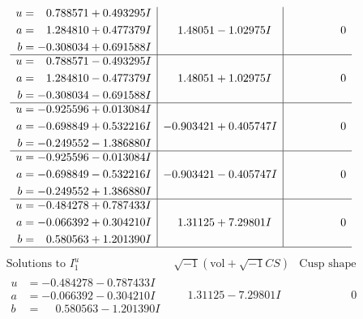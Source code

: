 \documentclass[1p]{elsarticle_modified}
\theoremstyle{definition}
\newcommand{\I}{\sqrt{-1}}
\begin{document}
$$\begin{array}{c|c|c}
\begin{aligned}
u &= \phantom{-}0.788571 + 0.493295 I \\
a &= \phantom{-}1.284810 + 0.477379 I \\
b &= -0.308034 + 0.691588 I\end{aligned}
 & \phantom{-}1.48051 - 1.02975 I & \phantom{-0.000000 } 0 \\ \hline\begin{aligned}
u &= \phantom{-}0.788571 - 0.493295 I \\
a &= \phantom{-}1.284810 - 0.477379 I \\
b &= -0.308034 - 0.691588 I\end{aligned}
 & \phantom{-}1.48051 + 1.02975 I & \phantom{-0.000000 } 0 \\ \hline\begin{aligned}
u &= -0.925596 + 0.013084 I \\
a &= -0.698849 + 0.532216 I \\
b &= -0.249552 - 1.386880 I\end{aligned}
 & -0.903421 + 0.405747 I & \phantom{-0.000000 } 0 \\ \hline\begin{aligned}
u &= -0.925596 - 0.013084 I \\
a &= -0.698849 - 0.532216 I \\
b &= -0.249552 + 1.386880 I\end{aligned}
 & -0.903421 - 0.405747 I & \phantom{-0.000000 } 0 \\ \hline\begin{aligned}
u &= -0.484278 + 0.787433 I \\
a &= -0.066392 + 0.304210 I \\
b &= \phantom{-}0.580563 + 1.201390 I\end{aligned}
 & \phantom{-}1.31125 + 7.29801 I & \phantom{-0.000000 } 0\\
 \hline 
 \end{array}$$\newpage$$\begin{array}{c|c|c}  
\text{Solutions to }I^u_{1}& \I (\text{vol} + \sqrt{-1}CS) & \text{Cusp shape}\\
 \hline 
\begin{aligned}
u &= -0.484278 - 0.787433 I \\
a &= -0.066392 - 0.304210 I \\
b &= \phantom{-}0.580563 - 1.201390 I\end{aligned}
 & \phantom{-}1.31125 - 7.29801 I & \phantom{-0.000000 } 0 \\ \hline\begin{aligned}

\end{aligned}
\end{array}$$
\end{document}
